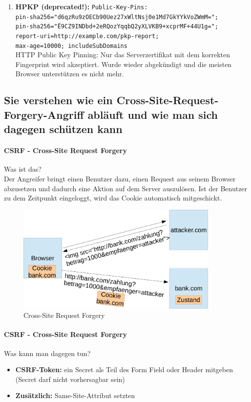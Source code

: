 \documentclass[10pt,a4paper]{article}
\begin{document}
\begin{enumerate}[noitemsep,topsep=0pt,leftmargin=*]
    \item \textbf{HPKP ({\color{red}deprecated!}):}
    \verb|Public-Key-Pins:|\\
    \verb|pin-sha256="d6qzRu9zOECb90Uez27xWltNsj0e1Md7GkYYkVoZWmM=";|\\
    \verb|pin-sha256="Ë9CZ9INDbd+2eRQozYqqbQ2yXLVKB9+xcprMF+44U1g=";|\\
    \verb|report-uri=http://example.com/pkp-report;|\\
    \verb|max-age=10000; includeSubDomains|\\
    HTTP Public Key Pinning: Nur das Serverzertifikat mit dem korrekten Fingerprint wird akzeptiert. Wurde wieder abgekündigt und die meisten Browser unterstützen es nicht mehr.
\end{enumerate}

\subsection*{Sie verstehen wie ein Cross-Site-Request-Forgery-Angriff abläuft und wie man sich dagegen schützen kann}

\paragraph*{CSRF - Cross-Site Request Forgery}Was ist das?\\
Der Angreifer bringt einen Benutzer dazu, einen Request aus seinem Browser abzusetzen und  dadurch eine Aktion auf dem Server auszulösen. Ist der Benutzer zu dem Zeitpunkt eingeloggt, wird das Cookie automatisch mitgeschickt.
\begin{figure}[H]
    \begin{center}
    \includegraphics[width=10cm]{images/CSRF.png}
    \caption{Cross-Site Request Forgery}
    \label{CSRF}
    \end{center}
\end{figure}
\paragraph*{CSRF - Cross-Site Request Forgery}Was kann man dagegen tun?
\begin{itemize}[noitemsep,topsep=0pt,leftmargin=*]
    \item \textbf{CSRF-Token:} ein Secret als Teil des Form Field oder Header mitgeben (Secret darf nicht vorhersagbar sein)
    \item \textbf{Zusätzlich:} Same-Site-Attribut setzten
\end{itemize}
\end{document}

